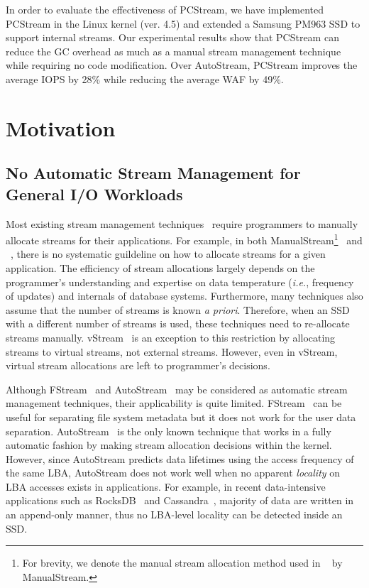 In order to evaluate the effectiveness of \textsf{\small PCStream}, we have
implemented \textsf{\small PCStream} in the Linux kernel (ver. 4.5) and
extended a Samsung PM963 SSD to support internal streams.  Our experimental
results show that \textsf{\small PCStream} can reduce the GC overhead as much
as a manual stream management technique while requiring no code modification.
Over \textsf{\small AutoStream}, \textsf{\small PCStream} improves the average
IOPS by 28\% while reducing the average WAF by 49\%.


\section{Motivation}
\subsection{No Automatic Stream Management for General I/O Workloads}
Most existing stream management techniques~\cite{MultiStream,Level,vStream} 
require programmers to manually allocate streams for their applications.
For example, 
in both \textsf{\small ManualStream\footnote{For brevity, we denote the manual stream allocation
method used in ~\cite{MultiStream} by \textsf{\scriptsize ManualStream}.}}~\cite{MultiStream} and 
~\cite{Level}, there is no systematic guildeline on how to
allocate streams for a given application. 
The efficiency of stream allocations largely depends on the programmer's 
understanding and expertise on data temperature ({\it i.e.}, frequency of updates)
and internals of database systems.
Furthermore, many
techniques also assume that the number of streams is known {\it a priori}.  
Therefore, when an SSD with a different number of streams is used, 
these techniques need to re-allocate streams manually.
\textsf{\small vStream}~\cite{vStream} 
is an exception to this 
restriction by allocating streams to virtual streams, not external streams.  
However, even in \textsf{\small vStream}, virtual stream allocations are left to
programmer's decisions.

Although \textsf{\small FStream}~\cite{FStream} and \textsf{\small AutoStream}~\cite{AutoStream}
may be considered 
as automatic stream management techniques,
their applicability is quite limited.
\textsf{\small FStream}~\cite{FStream} can be useful for separating file system metadata but it does not
work for the user data separation.
\textsf{\small AutoStream}~\cite{AutoStream} is the only known technique that works in a 
fully automatic fashion by making stream allocation decisions within 
the kernel.
However, since \textsf{\small AutoStream} predicts data lifetimes using the
access frequency of the same LBA, \textsf{\small AutoStream} does not work well 
when no apparent {\it locality} on LBA accesses exists in applications.  
For example, in recent data-intensive applications 
such as RocksDB~\cite{RocksDB} and Cassandra~\cite{Cassandra}, 
majority of data are written in an append-only manner,
thus no LBA-level locality can be detected inside an SSD.

